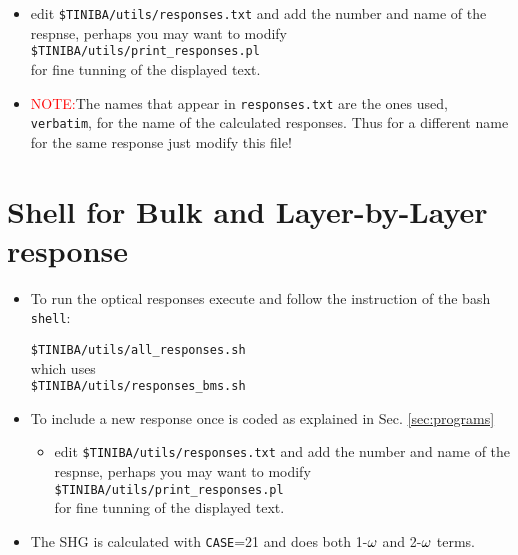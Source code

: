 \begin{itemize}
\begin{itemize}
\begin{itemize}
\item edit
\verb=$TINIBA/utils/responses.txt=  
and add the
 number and name of the respnse, perhaps you may want to modify\\
\verb=$TINIBA/utils/print_responses.pl=\\ for fine tunning
of the displayed text. 
\item\textcolor{red}{NOTE:}The names that appear in
  \verb=responses.txt= are the ones used, \verb=verbatim=, for the name
  of the calculated responses. Thus for a different name for the same
  response just modify this file!
\end{itemize}
\end{itemize}

\end{itemize}


\section{Shell for Bulk and Layer-by-Layer response}

\begin{itemize}

\item To run the optical responses execute and follow the instruction of the bash \verb=shell=:

  \verb=$TINIBA/utils/all_responses.sh=\\
which uses\\
\verb=$TINIBA/utils/responses_bms.sh=

\item To include a new response once is coded as explained in
 Sec. \ref{sec:programs} 

\begin{itemize}
\item edit
\verb=$TINIBA/utils/responses.txt=  
and add the
 number and name of the respnse, perhaps you may want to modify\\
\verb=$TINIBA/utils/print_responses.pl=\\ for fine tunning
of the displayed text.
\end{itemize}
\item The SHG is calculated with \verb=CASE==21 and does both 1-$\omega$
  and 2-$\omega$ terms.
\end{itemize}


